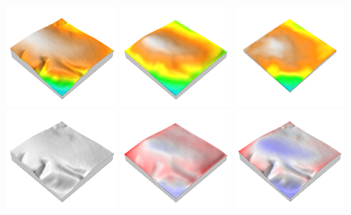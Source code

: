 \documentclass[prodmode,acmtochi]{acmsmall} %
\begin{document}
\begin{figure}[h!]
\begin{center}
		\includegraphics[width=0.32\textwidth]{images/render_3d/dem_4.png}
		\includegraphics[width=0.32\textwidth]{images/render_3d/mean_dem_4.png}
		\includegraphics[width=0.32\textwidth]{images/render_3d/stdev_dem_4.png}
		\includegraphics[width=0.32\textwidth]{images/render_3d/dem_difference_4.png}
		\includegraphics[width=0.32\textwidth]{images/render_3d/mean_dem_difference_4.png}
		\includegraphics[width=0.32\textwidth]{images/render_3d/mean_dem_regression_difference_4.png} %

\end{center}
\end{figure}
\end{document}
